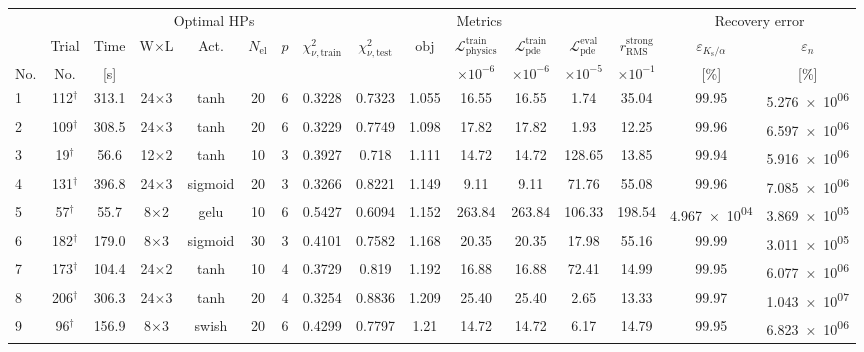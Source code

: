 \begin{tabular}{lcc cccc ccccccc cc}
\toprule
& & & \multicolumn{4}{c}{Optimal HPs} & \multicolumn{7}{c}{Metrics} & \multicolumn{2}{c}{Recovery error} \\
\cmidrule(lr){4-7}\cmidrule(lr){8-14}\cmidrule(lr){15-16}
& Trial & Time & W$\times$L & Act. & $N_{\mathrm{el}}$ & $p$ & $\chi^2_{\nu,\mathrm{train}}$ & $\chi^2_{\nu,\mathrm{test}}$ & $\mathrm{obj}$ & $\mathcal{L}_{\mathrm{physics}}^{\mathrm{train}}$ & $\mathcal{L}_{\mathrm{pde}}^{\mathrm{train}}$ & $\mathcal{L}_{\mathrm{pde}}^{\mathrm{eval}}$ & $r_{\mathrm{RMS}}^{\mathrm{strong}}$ & $\varepsilon_{K_{\mathrm{s}}/\alpha}$ & $\varepsilon_{n}$ \\
No. & No. & [s] &  &  &  &  &  &  &  & $\times 10^{-6}$ & $\times 10^{-6}$ & $\times 10^{-5}$ & $\times 10^{-1}$ & [\%] & [\%] \\
\midrule
  1 & 112$^\dagger$ & 313.1 & 24$\times$3 & tanh & 20 & 6 & \num{0.3228} & \num{0.7323} & \num{1.055} & 16.55 & 16.55 & 1.74 & 35.04 & \num{99.95} & \num{5.276e+06} \\
  2 & 109$^\dagger$ & 308.5 & 24$\times$3 & tanh & 20 & 6 & \num{0.3229} & \num{0.7749} & \num{1.098} & 17.82 & 17.82 & 1.93 & 12.25 & \num{99.96} & \num{6.597e+06} \\
  3 & 19$^\dagger$ & 56.6 & 12$\times$2 & tanh & 10 & 3 & \num{0.3927} & \num{0.718} & \num{1.111} & 14.72 & 14.72 & 128.65 & 13.85 & \num{99.94} & \num{5.916e+06} \\
  4 & 131$^\dagger$ & 396.8 & 24$\times$3 & sigmoid & 20 & 3 & \num{0.3266} & \num{0.8221} & \num{1.149} & 9.11 & 9.11 & 71.76 & 55.08 & \num{99.96} & \num{7.085e+06} \\
  5 & 57$^\dagger$ & 55.7 & 8$\times$2 & gelu & 10 & 6 & \num{0.5427} & \num{0.6094} & \num{1.152} & 263.84 & 263.84 & 106.33 & 198.54 & \num{4.967e+04} & \num{3.869e+05} \\
  6 & 182$^\dagger$ & 179.0 & 8$\times$3 & sigmoid & 30 & 3 & \num{0.4101} & \num{0.7582} & \num{1.168} & 20.35 & 20.35 & 17.98 & 55.16 & \num{99.99} & \num{3.011e+05} \\
  7 & 173$^\dagger$ & 104.4 & 24$\times$2 & tanh & 10 & 4 & \num{0.3729} & \num{0.819} & \num{1.192} & 16.88 & 16.88 & 72.41 & 14.99 & \num{99.95} & \num{6.077e+06} \\
  8 & 206$^\dagger$ & 306.3 & 24$\times$3 & tanh & 20 & 4 & \num{0.3254} & \num{0.8836} & \num{1.209} & 25.40 & 25.40 & 2.65 & 13.33 & \num{99.97} & \num{1.043e+07} \\
  9 & 96$^\dagger$ & 156.9 & 8$\times$3 & swish & 20 & 6 & \num{0.4299} & \num{0.7797} & \num{1.21} & 14.72 & 14.72 & 6.17 & 14.79 & \num{99.95} & \num{6.823e+06} \\

\end{tabular}
